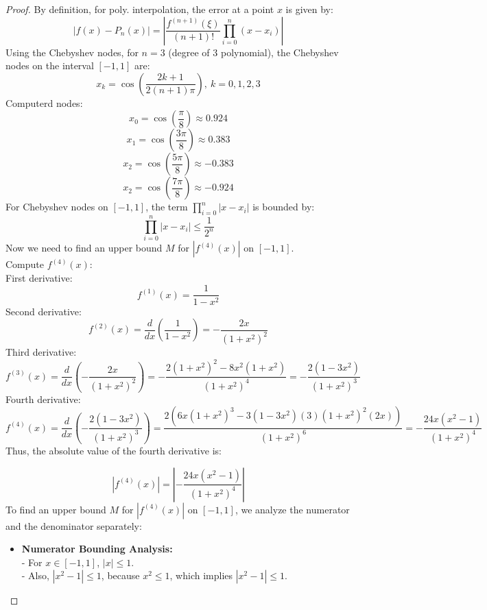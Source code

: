\documentclass{article}
\begin{document}
\begin{proof}
    By definition, for poly. interpolation, the error at a point $x$ is given by: 
    \[ \left| f(x) - P_n(x) \right| = \left| \frac{f^{(n+1)}(\xi)}{(n+1)!} \prod_{i=0}^{n} (x - x_i) \right| \]
    Using the Chebyshev nodes, for $n = 3$ (degree of 3 polynomial), the Chebyshev nodes on the interval $[-1,1]$ are:
    \[ x_k = \cos \left( \frac{2k + 1}{2(n + 1) \pi} \right), \ k = 0,1,2,3 \] 
    Computerd nodes:
    \[ x_0 = \cos(\frac{\pi}{8}) \approx 0.924 \]
    \[ x_1 = \cos(\frac{3\pi}{8}) \approx 0.383 \]
    \[ x_2 = \cos(\frac{5\pi}{8}) \approx -0.383 \]
    \[ x_2 = \cos(\frac{7\pi}{8}) \approx -0.924 \]
    For Chebyshev nodes on $[-1, 1]$, the term $\prod_{i=0}^{n} |x - x_i|$ is bounded by:
    \[ \prod_{i = 0}^{n} |x - x_i| \leq \frac{1}{2^n} \]
    Now we need to find an upper bound $M$ for $|f^{(4)}(x)|$ on $[-1, 1]$.
    \\
    Compute $f^{(4)}(x)$:
    \\
    First derivative:
    \[ f^{(1)}(x) = \frac{1}{1 - x^2} \]
    Second derivative:
    \[ f^{(2)}(x) = \frac{d}{dx} (\frac{1}{1 - x^2}) = - \frac{2x}{(1 + x^2)^2} \]
    Third derivative:
    \[ f^{(3)}(x) = \frac{d}{dx} (- \frac{2x}{(1 + x^2)^2}) = -\frac{2(1 + x^2)^2 - 8x^2(1 + x^2)}{(1 + x^2)^4} = -\frac{2(1 - 3x^2)}{(1 + x^2)^3} \]
    Fourth derivative:
    \[ f^{(4)}(x) = \frac{d}{dx} (-\frac{2(1 - 3x^2)}{(1 + x^2)^3}) = \frac{2(6x(1+x^2)^3 - 3(1-3x^2)(3)(1 + x^2)^2(2x))}{(1 + x^2)^6} = -\frac{24x(x^2 - 1)}{(1 + x^2)^4} \]
    Thus, the absolute value of the fourth derivative is:

    \[
        |f^{(4)}(x)| = \left| -\frac{24x(x^2 - 1)}{(1 + x^2)^4} \right|
    \]
    To find an upper bound \( M \) for \( |f^{(4)}(x)| \) on \([-1, 1]\), we analyze the numerator and the denominator separately:

    \begin{itemize}
        \item \textbf{Numerator Bounding Analysis:} 
        \\
        - For \( x \in [-1, 1] \), \( |x| \leq 1 \). 
        \\
        - Also, \( |x^2 - 1| \leq 1 \), because \( x^2 \leq 1 \), which implies \( |x^2 - 1| \leq 1 \).


\end{itemize}
\end{proof}
\end{document}
